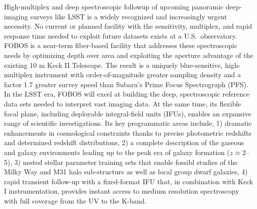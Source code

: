 \documentclass[oneside,12pt]{amsart}
\begin{document}
High-multiplex and deep spectroscopic followup of upcoming panoramic deep-imaging surveys like LSST is a widely
recognized and increasingly urgent necessity.  No current or planned facility with the sensitivity, multiplex, and
rapid response time needed to exploit future datasets exists at a U.S.~observatory.  FOBOS is a near-term fiber-based
facility that addresses these spectroscopic needs by optimizing depth over area and exploiting the aperture advantage
of the existing 10 m Keck II Telescope.  The result is a uniquely blue-sensitive, high-multiplex instrument with
order-of-magnitude greater sampling density and a factor 1.7 greater survey speed than Subaru's Prime Focus
Spectrograph (PFS). In the LSST era, FOBOS will excel at building the deep, spectroscopic reference data sets needed to
interpret vast imaging data. At the same time, its flexible focal plane, including deployable integral-field units
(IFUs), enables an expansive range of scientific investigations.  Its key programmatic areas include, 1) dramatic
enhancements in cosmological constraints thanks to precise photometric redshifts and determined redshift distributions,
2) a complete description of the gaseous and galaxy environments leading up to the peak era of galaxy formation ($z
\approx 2$--5), 3) nested stellar parameter training sets that enable fossibl studies of the Milky Way and M31 halo
sub-structure as well as local group dwarf galaxies, 4) rapid transient follow-up with a fixed-format IFU that, in
combination with Keck I instrumentation, provides instant access to medium resolution spectroscopy with full coverage
from the UV to the K-band.



\pagebreak















\clearpage
\begin{multicols}{2}
\scriptsize


\end{multicols}

\end{document}
